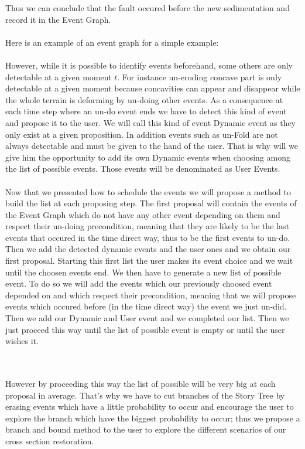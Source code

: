 \documentclass[12pt, a4paper]{memoir} %
\begin{document}
Thus we can conclude that the fault occured before the new sedimentation and record it in the Event Graph.\\\\

Here is an example of an event graph for a simple example:\\\\

However, while it is possible to identify events beforehand, some others are only detectable at a given moment $t$. For instance un-eroding concave part is only detectable at a given moment because concavities can appear and disappear while the whole terrain is deforming by un-doing other events. As a consequence at each time step where an un-do event ends we have to detect this kind of event and propose it to the user. We will call this kind of event Dynamic event as they only exist at a given proposition. In addition events such as un-Fold are not always detectable and must be given to the hand of the user. That is why will we give him the opportunity to add its own Dynamic events when choosing among the list of possible events. Those events will be denominated as User Events.\\\\

Now that we presented how to schedule the events we will propose a method to build the list  at each proposing step. The first proposal will contain the events of the Event Graph which do not have any other event depending on them and respect their un-doing precondition, meaning that they are likely to be the last events that occured in the time direct way, thus to be the first events to un-do. Then we add the detected dynamic events and the user ones and we obtain our first proposal. Starting this first list the user makes its event choice and we wait until the choosen events end. We then have to generate a new list of possible event. To do so we will add the events which our previously choosed event depended on and which respect their precondition, meaning that we will propose events which occured before (in the time direct way) the event we just un-did. Then we add our Dynamic and User event and we completed our list. Then we just proceed this way until the list of possible event is empty or until the user wishes it.\\\\\

However by proceeding this way the list of possible will be very big at each proposal in average. That's why we have to cut branches of the Story Tree by erasing events which have a little probability to occur and encourage the user to explore the branch which have the biggest probability to occur; thus we propose a branch and bound method to the user to explore the different scenarios of our cross section restoration.\\\\
\end{document}

